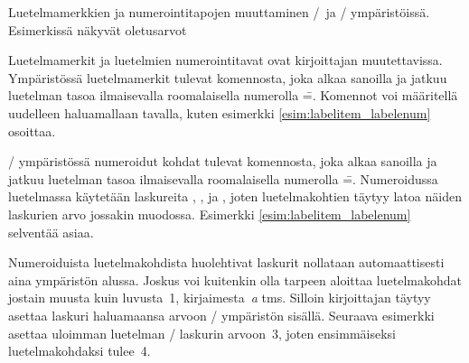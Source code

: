 \begin{esimerkki*}

\begin{koodilohko}
\renewcommand{\labelitemi}  {\textbullet} %
\renewcommand{\labelitemii} {\normalfont\bfseries\textendash}
\renewcommand{\labelitemiii}{\textasteriskcentered}
\renewcommand{\labelitemiv} {\textperiodcentered}

\renewcommand{\labelenumi}  {\arabic{enumi}.} %
\renewcommand{\labelenumii} {(\alph{enumii})}
\renewcommand{\labelenumiii}{\roman{enumiii}.}
\renewcommand{\labelenumiv} {\Alph{enumiv}.}
\end{koodilohko}
  \caption{Luetelmamerkkien ja numerointitapojen muuttaminen
    \-/\ ja \-/ ympäristöissä.
    Esimerkissä näkyvät oletusarvot}
  \label{esim:labelitem_labelenum}
\end{esimerkki*}

Luetelmamerkit ja luetelmien numerointitavat ovat kirjoittajan
muutettavissa. Ympäristössä  luetelmamerkit tulevat
komennosta, joka alkaa sanoilla  ja jatkuu
luetelman tasoa ilmaisevalla roomalaisella numerolla
\==. Komennot voi määritellä uudelleen haluamallaan
tavalla, kuten esimerkki \ref{esim:labelitem_labelenum} osoittaa.

\-/ ympäristössä numeroidut kohdat tulevat
komennosta, joka alkaa sanoilla  ja jatkuu
luetelman tasoa ilmaisevalla roomalaisella numerolla
\==. Numeroidussa luetelmassa käytetään laskureita
, ,  ja
, joten luetelmakohtien täytyy latoa näiden laskurien
arvo jossakin muodossa. Esimerkki \ref{esim:labelitem_labelenum}
selventää asiaa.

Numeroiduista luetelmakohdista huolehtivat laskurit nollataan
automaattisesti aina ympäristön alussa. Joskus voi kuitenkin olla
tarpeen aloittaa luetelmakohdat jostain muusta kuin luvusta~1,
kirjaimesta~\textit{a} tms. Silloin kirjoittajan täytyy asettaa laskuri
haluamaansa arvoon \-/ ympäristön sisällä. Seuraava
esimerkki asettaa uloimman luetelman \-/ laskurin
arvoon~3, joten ensimmäiseksi luetelmakohdaksi tulee~4.


